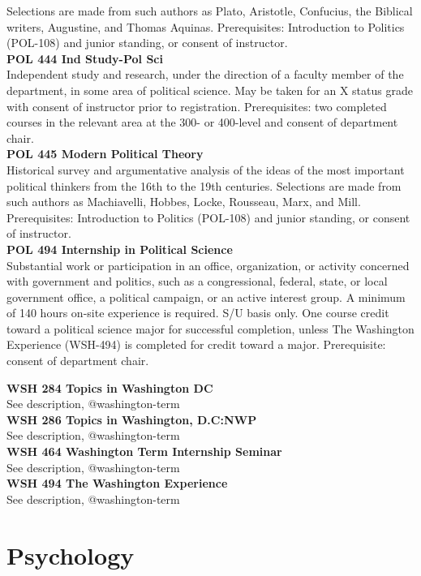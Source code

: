\documentclass[
  letterpaper,
]{scrbook}
\begin{document}
Selections are made from such authors as Plato, Aristotle, Confucius,
the Biblical writers, Augustine, and Thomas Aquinas. Prerequisites:
Introduction to Politics (POL-108) and junior standing, or consent of
instructor.\\
\textbf{POL 444 Ind Study-Pol Sci}\\
Independent study and research, under the direction of a faculty member
of the department, in some area of political science. May be taken for
an X status grade with consent of instructor prior to registration.
Prerequisites: two completed courses in the relevant area at the 300- or
400-level and consent of department chair.\\
\textbf{POL 445 Modern Political Theory}\\
Historical survey and argumentative analysis of the ideas of the most
important political thinkers from the 16th to the 19th centuries.
Selections are made from such authors as Machiavelli, Hobbes, Locke,
Rousseau, Marx, and Mill. Prerequisites: Introduction to Politics
(POL-108) and junior standing, or consent of instructor.\\
\textbf{POL 494 Internship in Political Science}\\
Substantial work or participation in an office, organization, or
activity concerned with government and politics, such as a
congressional, federal, state, or local government office, a political
campaign, or an active interest group. A minimum of 140 hours on-site
experience is required. S/U basis only. One course credit toward a
political science major for successful completion, unless The Washington
Experience (WSH-494) is completed for credit toward a major.
Prerequisite: consent of department chair.

\textbf{WSH 284 Topics in Washington DC}\\
See description, @washington-term\\
\textbf{WSH 286 Topics in Washington, D.C:NWP}\\
See description, @washington-term\\
\textbf{WSH 464 Washington Term Internship Seminar}\\
See description, @washington-term\\
\textbf{WSH 494 The Washington Experience}\\
See description, @washington-term

\section{Psychology}\label{sec-psychology}
\end{document}
